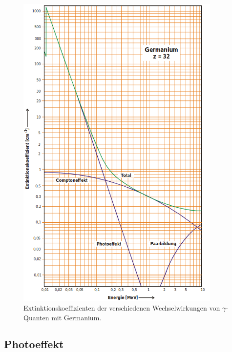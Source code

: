 \begin{figure}
  \centering
  \includegraphics[width=0.9\textwidth]{Pics/crosssection.png}
  \caption{Extinktionskoeffizienten der verschiedenen Wechselwirkungen von $\gamma$-Quanten mit Germanium\cite{anleitung}.}
  \label{fig:crosssection}
\end{figure}

\subsection{Photoeffekt}
\label{subsec:photo}

